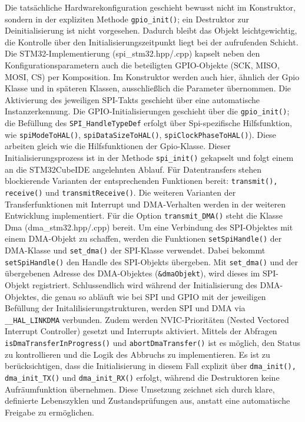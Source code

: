 Die tatsächliche Hardwarekonfiguration geschieht bewusst nicht im Konstruktor, sondern in der expliziten Methode \texttt{gpio\_init()}; ein Destruktor zur Deinitialisierung ist nicht vorgesehen.
Dadurch bleibt das Objekt leichtgewichtig, die Kontrolle über den Initialisierungszeitpunkt liegt bei der aufrufenden Schicht.
\\
Die STM32-Implementierung (spi\_stm32.hpp/.cpp) kapselt neben den Konfigurationsparametern auch die beteiligten GPIO-Objekte (SCK, MISO, MOSI, CS) per Komposition. 
Im Konstruktor werden auch hier, ähnlich der Gpio Klasse und in späteren Klassen, ausschließlich die Parameter übernommen. 
Die Aktivierung des jeweiligen SPI-Takts geschieht über eine automatische Instanzerkennung.
Die GPIO-Initialisierungen geschieht über die \texttt{gpio\_init()}; 
die Befüllung des \texttt{SPI\_HandleTypeDef}  erfolgt über Spi-spezifische Hilfsfunktion, wie \texttt{spiModeToHAL()}, \texttt{spiDataSizeToHAL()}, \texttt{spiClockPhaseToHAL()}). 
Diese arbeiten gleich wie die Hilfsfunktionen der Gpio-Klasse.
Dieser Initialisierungsprozess ist in der Methode \texttt{spi\_init()} gekapselt und folgt einem an die STM32CubeIDE angelehnten Ablauf.
Für Datentransfers stehen blockierende Varianten der entsprechenden Funktionen bereit: \texttt{transmit(), receive()} und \texttt{transmitReceive()}.%
Die weiteren Varianten der Transferfunktionen mit Interrupt und DMA-Verhalten werden in der weiteren Entwicklung implementiert.
Für die Option \texttt{transmit\_DMA()} steht die Klasse Dma (dma\_stm32.hpp/.cpp) bereit.
Um eine Verbindung des SPI-Objektes mit einem DMA-Objekt zu schaffen, werden die Funktionen \texttt{setSpiHandle()} der DMA-Klasse und \texttt{set\_dma()} der SPI-Klasse verwendet.
Dabei bekommt \texttt{setSpiHandle()} den Handle des SPI-Objekts übergeben.
Mit \texttt{set\_dma()} und der übergebenen Adresse des DMA-Objektes (\texttt{\&dmaObjekt}), wird dieses im SPI-Objekt registriert.
Schlussendlich wird während der Initialisierung des DMA-Objektes, die genau so abläuft wie bei SPI und GPIO mit der jeweiligen Befüllung der Initalilisierungstrukturen, werden SPI und DMA via \texttt{\_\_HAL\_LINKDMA} verbunden.
Zudem werden NVIC-Prioritäten (Nested Vectored Interrupt Controller) gesetzt und Interrupts aktiviert.
Mittels der Abfragen \texttt{isDmaTransferInProgress()} und \texttt{abortDmaTransfer()} ist es möglich, den Status zu kontrollieren und die Logik des Abbruchs zu implementieren.
Es ist zu berücksichtigen, dass die Initialisierung in diesem Fall explizit über \texttt{dma\_init(), dma\_init\_TX()} und \texttt{dma\_init\_RX()} erfolgt, während die Destruktoren keine Aufräumfunktion übernehmen.
Diese Umsetzung zeichnet sich durch klare, definierte Lebenszyklen und Zustandsprüfungen aus, anstatt eine automatische Freigabe zu ermöglichen.

